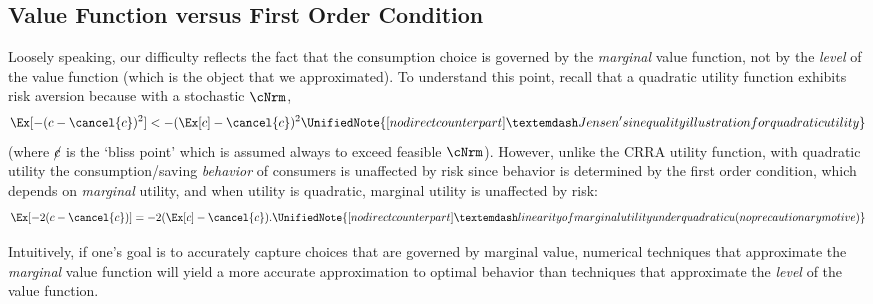 \hypertarget{value-function-versus-first-order-condition}{}
\subsection{Value Function versus First Order Condition}\label{subsec:vVsuP}

Loosely speaking, our difficulty reflects the fact that the
consumption choice is governed by the \textit{marginal} value function,
not by the \textit{level} of the value function (which is the object that
we approximated).  To understand this point, recall that a quadratic
utility function
exhibits risk aversion because with a stochastic $\cNrm$,
\begin{equation}
  \Ex[-(c - \cancel{c})^{2}] < - (\Ex[c] - \cancel{c})^{2}
\UnifiedNote{[no direct counterpart] — Jensen's inequality illustration for quadratic utility}
\end{equation}
(where $\cancel{c}$ is the `bliss point' which is assumed always to exceed feasible $\cNrm$). However, unlike the CRRA utility function,
with quadratic utility the consumption/saving \textit{behavior} of consumers
is unaffected by risk since behavior is determined by the first order condition, which
depends on \textit{marginal} utility, and when utility is quadratic, marginal utility is unaffected
by risk:
\begin{equation}
  \Ex[-2(c - \cancel{c})] = - 2(\Ex[c] - \cancel{c}).
\UnifiedNote{[no direct counterpart] — linearity of marginal utility under quadratic u (no precautionary motive)}
\end{equation}

Intuitively, if one's goal is to accurately capture choices
that are governed by marginal value,
numerical techniques that approximate the \textit{marginal} value
function will yield a more accurate approximation to
optimal behavior than techniques that approximate the \textit{level}
of the value function.

